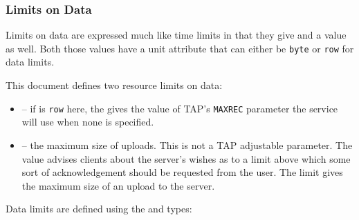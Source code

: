 \documentclass{ivoa}
\begin{document}

\subsubsection{Limits on Data}
Limits on data are expressed much like time limits in that they give
 and a  value as well.  
Both those values have a unit attribute that can either be \texttt{byte}
or \texttt{row} for data limits.

This document defines two resource limits on data:


\begin{itemize}

\item {} -- if  is \texttt{row} here,
the  gives the
value of TAP's \texttt{MAXREC} parameter the service will use when none
is specified.{}

\item {} -- the maximum size of uploads.  This 
is not a TAP adjustable parameter.  The  value
advises clients about the server's wishes as to a limit above which
some sort of acknowledgement should be requested from the user.  The 
 limit gives the maximum size of an upload to the 
server.{}

\end{itemize}
Data limits are defined using the 
and  types:
\end{document}
